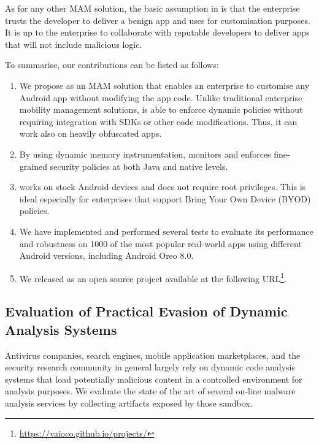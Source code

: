 As for any other MAM solution, the basic assumption in \asd is that the enterprise trusts the developer to deliver a benign app and uses \asd for customisation purposes. It is up to the enterprise to collaborate with reputable developers to deliver apps that will not include malicious logic. 

To summarise, our contributions can be listed as follows: 

\begin{enumerate}
\item We propose \asd as an MAM solution that enables an enterprise to customise any Android app without modifying the app code. Unlike traditional enterprise mobility management solutions, \asd is able to enforce dynamic policies without requiring integration with SDKs or other code modifications. Thus, it can work also on heavily obfuscated apps.

\item By using dynamic memory instrumentation, \asd monitors and enforces fine-grained security policies at both Java and native levels.

\item \asd works on stock Android devices and does not require root privileges. This is ideal especially for enterprises that support Bring Your Own Device (BYOD) policies.  

\item We have implemented \asd and performed several tests to evaluate its performance and robustness on 1000 of the most popular real-world apps using  different Android versions, including Android Oreo 8.0. 

\item We released \asd as an open source project available at the following URL\footnote{ \url{https://vaioco.github.io/projects/}}.
\end{enumerate}


\subsection{Evaluation of Practical Evasion of Dynamic Analysis Systems}

Antivirus companies, search engines, mobile application marketplaces, and the security research community in general largely rely on dynamic code analysis systems that load potentially malicious content in a controlled environment for analysis purposes. We evaluate the state of the art of several on-line malware analysis services by collecting artifacts exposed by those sandbox. 


